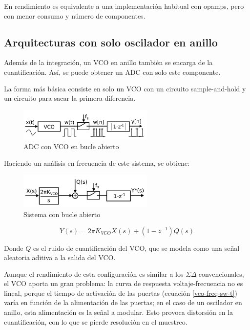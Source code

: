 \documentclass[12pt]{report} %
\newcommand{\sigmadelta}{$\Sigma\Delta\; $}
\begin{document}
	En rendimiento es equivalente a una implementación habitual con opamps, pero con menor consumo y número de componentes.
	
	\subsection{Arquitecturas con solo oscilador en anillo}
	
	Además de la integración, un VCO en anillo también se encarga de la cuantificación. Así, se puede obtener un ADC con solo este componente.
	
	La forma más básica consiste en solo un VCO con un circuito sample-and-hold y un circuito para sacar la primera diferencia.
	\begin{figure}[H]
		\includegraphics[width=0.6\textwidth]{vco-adc-open-loop.png}
		\caption[ADC con VCO en bucle abierto]{ADC con VCO en bucle abierto\protect\footnotemark}
		\label{fig:vco-adc-open-loop.png}
	\end{figure}
	
	Haciendo un análisis en frecuencia de este sistema, se obtiene:
	\begin{figure}[H]
		\includegraphics[width=0.6\textwidth]{vco-adc-open-loop-lp.png}
		\caption[Sistema con bucle abierto]{Sistema con bucle abierto\protect\footnotemark}
		\label{fig:vco-adc-open-loop-lp.png}
	\end{figure}
	
	\begin{figure}[h]
		\begin{equation}
			\label{vco-open-loop-laplace}
			Y(s)=2\pi K_{VCO}X(s) + (1 - z^{-1})Q(s)
		\end{equation}
	\end{figure}
	
	Donde $Q$ es el ruido de cuantificación del VCO, que se modela como una señal aleatoria aditiva a la salida del VCO.
	
	Aunque el rendimiento de esta configuración es similar a los \sigmadelta convencionales, el VCO aporta un gran problema: la curva de respuesta voltaje-frecuencia no es lineal, porque el tiempo de activación de las puertas (ecuación \ref{vco-freq-sw-t}) varía en función de la alimentación de las puertas; en el caso de un oscilador en anillo, esta alimentación es la señal a modular. Esto provoca distorsión en la cuantificación, con lo que se pierde resolución en el muestreo.
	
\end{document}
